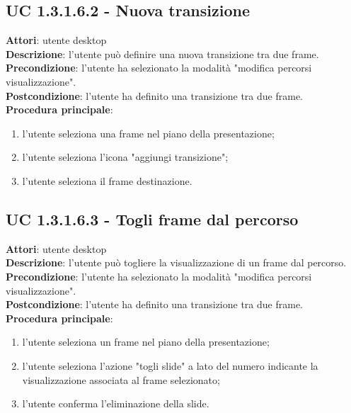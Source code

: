\subsection{UC 1.3.1.6.2 - Nuova transizione}{
	\label{uc1.3.1.6.2}
	\textbf{Attori}: utente desktop \\
	\textbf{Descrizione}: l'utente può definire una nuova transizione tra due frame. \\
	\textbf{Precondizione}: l'utente ha selezionato la modalità "modifica percorsi visualizzazione".	\\
	\textbf{Postcondizione}: l'utente ha definito una transizione tra due frame.	\\
	\textbf{Procedura principale}:
	\begin{enumerate}
		\item l'utente seleziona una frame nel piano della presentazione;
		\item l'utente seleziona l'icona "aggiungi transizione";
		\item l'utente seleziona il frame destinazione.
	\end{enumerate}
}
\subsection{UC 1.3.1.6.3 - Togli frame dal percorso}{
	\label{uc1.3.1.6.3}
	\textbf{Attori}: utente desktop \\
	\textbf{Descrizione}: l'utente può togliere la visualizzazione di un frame dal percorso. \\
	\textbf{Precondizione}: l'utente ha selezionato la modalità "modifica percorsi visualizzazione".	\\
	\textbf{Postcondizione}: l'utente ha definito una transizione tra due frame.	\\
	\textbf{Procedura principale}:
	\begin{enumerate}
		\item l'utente seleziona un frame nel piano della presentazione;
		\item l'utente seleziona l'azione "togli slide" a lato del numero indicante la visualizzazione associata al frame selezionato;
		\item l'utente conferma l'eliminazione della slide.
	\end{enumerate}
}
